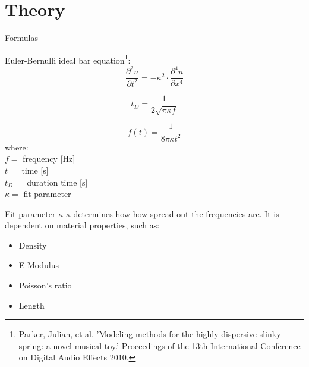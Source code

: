 \documentclass{beamer}
\begin{document}
\section {Theory}
	\begin{frame}{Formulas}
		
		Euler-Bernulli ideal bar equation\footnote{ \tiny{ Parker, Julian, et al. 'Modeling methods for the highly dispersive slinky spring: a
novel musical toy.' Proceedings of the 13th International Conference on Digital
Audio Effects 2010.}}:
		\begin{equation}
			\frac{\partial ^2 u }{\partial t^2} = -\kappa ^2 \cdot  \frac{\partial^4 u}  {\partial x^4}  
		\end{equation}
		
		
		\begin{equation}
			t_D = \frac{1}{2 \sqrt{\pi  \kappa  f}}
		\end{equation}
		
		\begin{equation}
			f(t) = \frac{1} {8 \pi \kappa t^2}
		\end{equation}
		where: \\
		$f =$ frequency [Hz] \\
		$t =$ time [s] \\
		$t_D =$ duration time [s] \\
		$\kappa =$ fit parameter
				
	\end{frame}

	\begin{frame}{Fit parameter $\kappa$}
	$\kappa$ determines how how spread out the frequencies are. It is dependent on material properties, such as:
		\begin{itemize}
		\item
		Density
		\item
		E-Modulus
		\item
		Poisson's ratio
		\item
		Length			
		\end{itemize}
	\end{frame}
\end{document}
